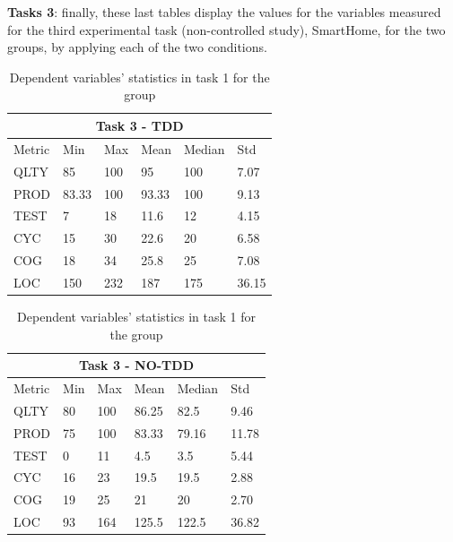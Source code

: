 \textbf{Tasks 3}: finally, these last tables display the values for the variables measured for the third experimental task (non-controlled study), SmartHome, for the two groups, by applying each of the two conditions.
\begin{table}[!h]
    \begin{center} 
        \begin{tabular}{ |p{2cm}||p{1.6cm}|p{1.6cm}|p{1.6cm}|p{1.6cm}|p{1.6cm}|}
            \hline
                \multicolumn{6}{|c|}{Task 3 - TDD} \\
            \hline
                Metric & Min & Max & Mean & Median & Std\\
            \hline
                QLTY & 85 & 100 & 95 & 100 & 7.07 \\
                PROD & 83.33 & 100 & 93.33 & 100 & 9.13 \\
                TEST & 7 & 18 & 11.6 & 12 & 4.15 \\
                CYC & 15 & 30 & 22.6 & 20 & 6.58 \\
                COG & 18 & 34 & 25.8 & 25 & 7.08 \\
                LOC & 150 & 232 & 187 & 175 & 36.15 \\
            \hline
        \end{tabular}
        \caption{\label{tab_dv_t3_tdd}Dependent variables' statistics in task 1 for the \tdd group}
    \end{center}
\end{table}

\begin{table}[!h]
    \begin{center} 
        \begin{tabular}{ |p{2cm}||p{1.6cm}|p{1.6cm}|p{1.6cm}|p{1.6cm}|p{1.6cm}|}
            \hline
                \multicolumn{6}{|c|}{Task 3 - NO-TDD} \\
            \hline
                Metric & Min & Max & Mean & Median & Std\\
            \hline
                QLTY & 80 & 100 & 86.25 & 82.5 & 9.46 \\
                PROD & 75 & 100 & 83.33 & 79.16 & 11.78 \\
                TEST & 0 & 11 & 4.5 & 3.5 & 5.44 \\
                CYC & 16 & 23 & 19.5 & 19.5 & 2.88 \\
                COG & 19 & 25 & 21 & 20 & 2.70 \\
                LOC & 93 & 164 & 125.5 & 122.5 & 36.82 \\
            \hline
        \end{tabular}
        \caption{\label{tab_dv_t1_2_notdd}Dependent variables' statistics in task 1 for the \notdd group}
    \end{center}
\end{table}

